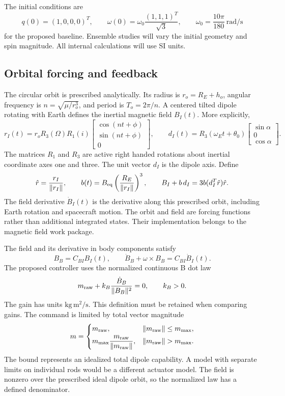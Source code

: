 The initial conditions are
\[
q(0)=(1,0,0,0)^T,
\qquad
\omega(0)=\omega_0\frac{(1,1,1)^T}{\sqrt{3}},
\qquad
\omega_0=\frac{10\pi}{180}\ \mathrm{rad/s}
\]
for the proposed baseline. Ensemble studies will vary the initial geometry and spin magnitude. All internal calculations will use SI units.

\subsection{Orbital forcing and feedback}
The circular orbit is prescribed analytically. Its radius is \(r_o=R_E+h_o\), angular frequency is \(n=\sqrt{\mu/r_o^3}\), and period is \(T_o=2\pi/n\). A centered tilted dipole rotating with Earth defines the inertial magnetic field \(B_I(t)\). More explicitly,
\[
r_I(t)=r_o R_3(\Omega)R_1(i)
\begin{bmatrix}
\cos(nt+\phi)\\
\sin(nt+\phi)\\
0
\end{bmatrix},
\qquad
d_I(t)=R_3(\omega_Et+\theta_0)
\begin{bmatrix}
\sin\alpha\\
0\\
\cos\alpha
\end{bmatrix}.
\]
The matrices \(R_1\) and \(R_3\) are active right handed rotations about inertial coordinate axes one and three. The unit vector \(d_I\) is the dipole axis. Define
\[
\hat r=\frac{r_I}{\|r_I\|},
\qquad
b(t)=B_{\rm eq}\left(\frac{R_E}{\|r_I\|}\right)^3,
\qquad
B_I+b\,d_I=3b(d_I^T\hat r)\hat r.
\]
The field derivative \(\dot B_I(t)\) is the derivative along this prescribed orbit, including Earth rotation and spacecraft motion. The orbit and field are forcing functions rather than additional integrated states. Their implementation belongs to the magnetic field work package.

The field and its derivative in body components satisfy
\[
B_B=C_{BI}B_I(t),
\qquad
\dot B_B+\omega\times B_B=C_{BI}\dot B_I(t).
\]
The proposed controller uses the normalized continuous B dot law
\[
m_{\rm raw}+k_B\frac{\dot B_B}{\|B_B\|^2}=0,
\qquad k_B>0.
\]
The gain has units \(\mathrm{kg\,m^2/s}\). This definition must be retained when comparing gains. The command is limited by total vector magnitude
\[
m=\begin{cases}
m_{\rm raw},&\|m_{\rm raw}\|\leq m_{\max},\\[2pt]
m_{\max}\dfrac{m_{\rm raw}}{\|m_{\rm raw}\|},&
\|m_{\rm raw}\|>m_{\max}.
\end{cases}
\]
The bound represents an idealized total dipole capability. A model with separate limits on individual rods would be a different actuator model. The field is nonzero over the prescribed ideal dipole orbit, so the normalized law has a defined denominator.


